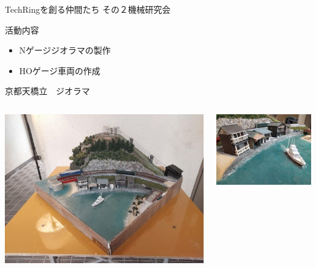 \documentclass[dvipdfmx]{beamer}
\begin{document}
\begin{frame}{TechRingを創る仲間たち その２}{機械研究会}

  \vspace{-2mm}
  
  \begin{minipage}{0.85\textwidth}
    \begin{block}{活動内容}
      \begin{itemize}
        \item Nゲージジオラマの製作
        \item HOゲージ車両の作成
      \end{itemize}
    \end{block}
  \end{minipage}

  \begin{alertblock}{京都天橋立　ジオラマ}
    \begin{columns}[totalwidth=\textwidth]
      \begin{column}{0.5\textwidth}
        \includegraphics[scale=0.42]{pic/mekaken1.jpg}
      \end{column}
      \begin{column}{0.22\textwidth}
        \includegraphics[scale=0.4]{pic/mekaken2.jpg}\\

\end{column}
\end{columns}
\end{alertblock}
\end{frame}
\end{document}
